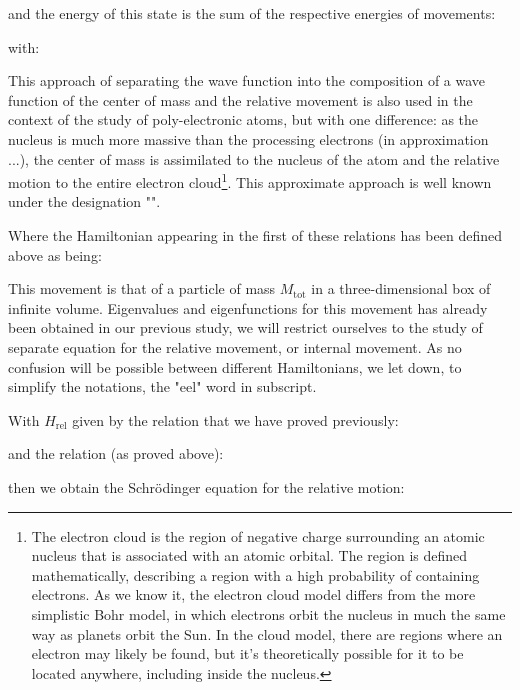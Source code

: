 	and the energy of this state is the sum of the respective energies of movements:
	
	with:
	
	\begin{tcolorbox}[title=Remark,arc=10pt,breakable,drop lifted shadow,
  skin=enhanced,
  skin first is subskin of={enhancedfirst}{arc=10pt,no shadow},
  skin middle is subskin of={enhancedmiddle}{arc=10pt,no shadow},
  skin last is subskin of={enhancedlast}{drop lifted shadow}]
	This approach of separating the wave function into the composition of a wave function of the center of mass and the relative movement is also used in the context of the study of poly-electronic atoms, but with one difference: as the nucleus is much more massive than the processing electrons (in approximation ...), the center of mass is assimilated to the nucleus of the atom and the relative motion to the entire electron cloud\footnote{The electron cloud is the region of negative charge surrounding an atomic nucleus that is associated with an atomic orbital. The region is defined mathematically, describing a region with a high probability of containing electrons. As we know it, the electron cloud model differs from the more simplistic Bohr model, in which electrons orbit the nucleus in much the same way as planets orbit the Sun. In the cloud model, there are regions where an electron may likely be found, but it's theoretically possible for it to be located anywhere, including inside the nucleus.}. This approximate approach is well known under the designation "".
	\end{tcolorbox}
	Where the Hamiltonian appearing in the first of these relations has been defined above as being:
	
	This movement is that of a particle of mass $M_{\text{tot}}$ in a three-dimensional box of infinite volume. Eigenvalues and eigenfunctions for this movement has already been obtained in our previous study, we will restrict ourselves to the study of separate equation for the relative movement, or internal movement. As no confusion will be possible between different Hamiltonians, we let down, to simplify the notations, the "eel" word in subscript.
	
	With $H_{\text{rel}}$ given by the relation that we have proved previously:
	
	and the relation (as proved above):
	
	then we obtain the Schrödinger equation for the relative motion:
	
